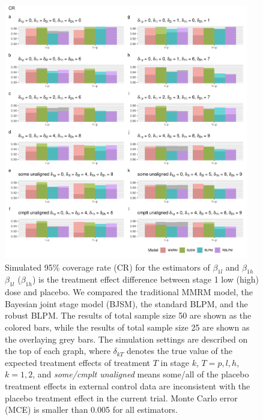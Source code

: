 \begin{figure}
\includegraphics[width=0.95\textwidth]{chapters/figures/CR_longitudinal.pdf}
\caption{Simulated 95\% coverage rate (CR) for the estimators of $\beta_{1l}$ and $\beta_{1h}$\label{fig:CR_longitudinal}\\$\beta_{1l}$ ($\beta_{1h}$) is the treatment effect difference between stage 1 low (high) dose and placebo. We compared the traditional MMRM model, the Bayesian joint stage model (BJSM), the standard BLPM, and the robust BLPM. The results of total sample size 50 are shown as the colored bars, while the results of total sample size 25 are shown as the overlaying grey bars. The simulation settings are described on the top of each graph, where $\delta_{kT}$ denotes the true value of the expected treatment effects of treatment $T$ in stage $k$, $T = p, l, h$, $k = 1, 2$, and \emph{some/cmplt unaligned} means some/all of the placebo treatment effects in external control data are inconsistent with the placebo treatment effect in the current trial. Monte Carlo error (MCE) is smaller than 0.005 for all estimators.}
\end{figure}


